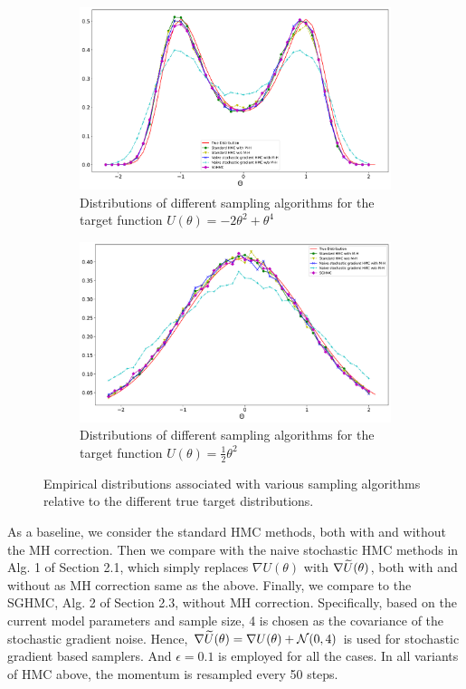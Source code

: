 \begin{figure}[h!]
\begin{subfigure}{.5\textwidth}
\includegraphics[width=.9\linewidth]{parts/Images/fig1a.pdf}
\caption{Distributions of different sampling algorithms for the target function $U(\theta) = -2\theta^2 + \theta^4$}
\label{fig1a}
\end{subfigure}%
\begin{subfigure}{.5\textwidth}
\includegraphics[width=.9\linewidth]{parts/Images/fig1b.pdf}
\caption{Distributions of different sampling algorithms for the target function $U(\theta) = \frac{1}{2}\theta^2$}
\label{fig1b}
\end{subfigure}
\caption{Empirical distributions associated with various sampling algorithms relative to the different true target distributions.}
\label{fig:demo}
\end{figure}

As a baseline, we consider the standard HMC methods, both with and without the MH correction. Then we compare with the naive stochastic HMC methods in Alg. 1 of Section 2.1, which simply replaces $\nabla U(\theta)$ with $\nabla \widetilde{U}(\theta)$, both with and without as MH correction same as the above. Finally, we compare to the SGHMC, Alg. 2 of Section 2.3, without MH correction. Specifically, based on the current model parameters and sample size, 4 is chosen as the covariance of the stochastic gradient noise. Hence, $\nabla \widetilde{U}(\theta) = \nabla U(\theta) + \mathcal{N}(0,4)$ is used for stochastic gradient based samplers. And $\epsilon = 0.1$  is employed for all the cases. In all variants of HMC above, the momentum is resampled every 50 steps.

